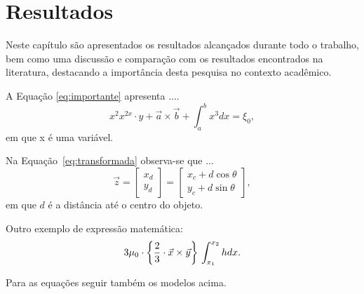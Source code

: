 \chapter{Resultados} \label{resultado}

Neste capítulo são apresentados os resultados alcançados durante todo o trabalho, bem como uma discussão  e comparação com os resultados encontrados na literatura, destacando a importância desta pesquisa no contexto acadêmico.

A Equação \ref{eq:importante}
apresenta ....
%
\begin{equation}
\label{eq:importante}
    x^2      x^{2x} \cdot y + \vec{a}\times \vec{b} + \int_{a}^{b}x^3 dx = \xi_0 ,
\end{equation}
em que x é uma variável.

Na Equação~\ref{eq:transformada} observa-se que ...
%
\begin{equation}
\label{eq:transformada}
\vec{z} = \begin{bmatrix}
x_d 
\\ 
y_d 
\end{bmatrix} = \begin{bmatrix}
x_c + d\cos\theta
\\ 
y_c + d\sin\theta 
\end{bmatrix},
\end{equation}
em que $d$ é a distância até o centro do objeto.

Outro exemplo de expressão matemática:
%
\begin{equation}
   3\mu_0 \cdot \left \{ \frac{2}{3} \cdot \vec{x}\times \vec{y} \right \} \\
   \int_{x_1}^{x_2}hdx .
\end{equation}

Para as equações seguir também os modelos acima.